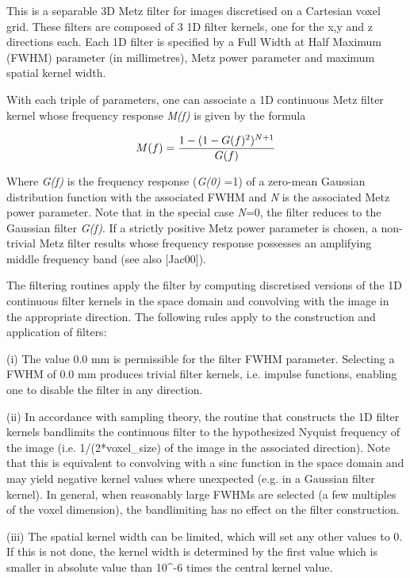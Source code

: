 \documentclass{article}
\begin{document}
This is a separable 3D Metz filter for images discretised on 
a Cartesian voxel grid. These filters are composed of 3 1D filter 
kernels, one for the x,y and z directions each. Each 1D filter 
is specified by a Full Width at Half Maximum (FWHM) parameter 
(in millimetres), Metz power parameter and maximum spatial kernel 
width. 



With each triple of parameters, one can associate a 1D continuous 
Metz filter kernel whose frequency response \textit{M(f)} is given 
by the formula

\[
M(f)=
{1-(1-G(f)^2)^{N+1}
\over
G(f)
}
\]

Where \textit{G(f)} is the frequency response (\textit{G(0)} =1) of a zero-mean 
Gaussian distribution function with the associated FWHM and \textit{N} 
is the associated Metz power parameter. Note that in the special 
case \textit{N}=0, the filter reduces to the Gaussian filter \textit{G(f)}. 
If a strictly positive Metz power parameter is chosen, a non-trivial 
Metz filter results whose frequency response possesses an amplifying 
middle frequency band (see also [Jac00]).



The filtering routines apply the filter by computing discretised 
versions of the 1D continuous filter kernels in the space domain 
and convolving with the image in the appropriate direction. The 
following rules apply to the construction and application of 
filters:



(i) The value 0.0 mm is permissible for the filter FWHM parameter. 
Selecting a FWHM of 0.0 mm produces trivial filter kernels, i.e. 
impulse functions, enabling one to disable the filter in any 
direction. 



(ii) In accordance with sampling theory, the routine that constructs 
the 1D filter kernels bandlimits the continuous filter to the 
hypothesized Nyquist frequency of the image (i.e. 1/(2*voxel\_size) 
of the image in the associated direction). Note that this is 
equivalent to convolving with a sinc function in the space domain 
and may yield negative kernel values where unexpected (e.g. in 
a Gaussian filter kernel). In general, when reasonably large 
FWHMs are selected (a few multiples of the voxel dimension), 
the bandlimiting has no effect on the filter construction.



(iii) The spatial kernel width can be limited, which will set 
any other values to 0. If this is not done, the kernel width 
is determined by the first value which is smaller in absolute 
value than 10{\textasciicircum}-6 times the central kernel value.
\end{document}
